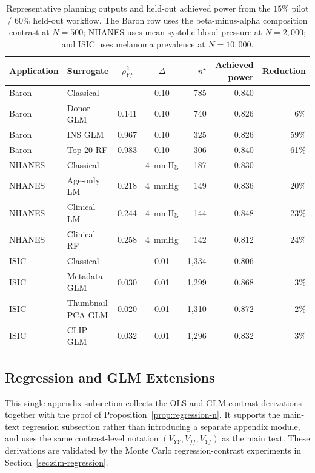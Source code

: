 \begin{table}[!ht]
\centering
\caption{Representative planning outputs and held-out achieved power
  from the $15\%$ pilot / $60\%$ held-out workflow.  The Baron row
  uses the beta-minus-alpha composition contrast at $N = 500$; NHANES
  uses mean systolic blood pressure at $N = 2{,}000$; and ISIC uses
  melanoma prevalence at $N = 10{,}000$.}
\label{tab:applications}
\small
\begin{tabular}{llccrrr}
\toprule
Application & Surrogate & $\rho_{Yf}^2$ & $\Delta$ & $n^\star$
  & Achieved power & Reduction \\
\midrule
Baron & Classical & --- & 0.10 & 785 & 0.840 & --- \\
Baron & Donor GLM & 0.141 & 0.10 & 740 & 0.826 & 6\% \\
Baron & INS GLM & 0.967 & 0.10 & 325 & 0.826 & 59\% \\
Baron & Top-20 RF & 0.983 & 0.10 & 306 & 0.840 & 61\% \\
NHANES & Classical & --- & 4~mmHg & 187 & 0.830 & --- \\
NHANES & Age-only LM & 0.218 & 4~mmHg & 149 & 0.836 & 20\% \\
NHANES & Clinical LM & 0.244 & 4~mmHg & 144 & 0.848 & 23\% \\
NHANES & Clinical RF & 0.258 & 4~mmHg & 142 & 0.812 & 24\% \\
ISIC & Classical & --- & 0.01 & 1{,}334 & 0.806 & --- \\
ISIC & Metadata GLM & 0.030 & 0.01 & 1{,}299 & 0.868 & 3\% \\
ISIC & Thumbnail PCA GLM & 0.020 & 0.01 & 1{,}310 & 0.872 & 2\% \\
ISIC & CLIP GLM & 0.032 & 0.01 & 1{,}296 & 0.832 & 3\% \\
\bottomrule
\end{tabular}
\end{table}

\subsection{Regression and GLM Extensions}
\label{sec:regression-appendix}

This single appendix subsection collects the OLS and GLM contrast
derivations together with the proof of
Proposition~\ref{prop:regression-n}.  It supports the main-text
regression subsection rather than introducing a separate appendix
module, and uses the same contrast-level notation
$(V_{YY}, V_{ff}, V_{Yf})$ as the main text. These derivations are
validated by the Monte Carlo regression-contrast experiments in
Section~\ref{sec:sim-regression}.

